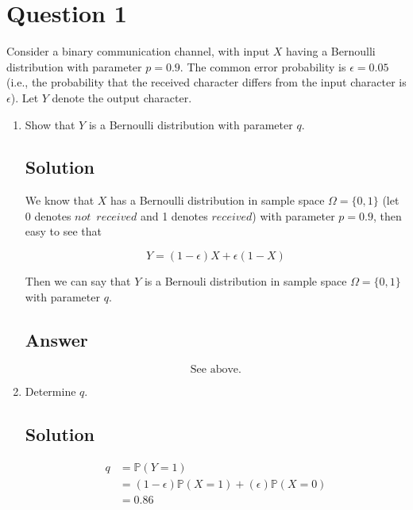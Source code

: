 \documentclass[12pt]{article}
\newcommand{\bP}{\mathbb{P}}
\begin{document}
	
	\section*{Question 1}
	
	\noindent Consider a binary communication channel, with input $X$ having a Bernoulli distribution with parameter $p = 0.9$. The common error probability is $\epsilon = 0.05$ (i.e., the probability that the received character differs from the input character is $\epsilon$). Let $Y$ denote the output character.
	
	\bigskip
	
	\begin{enumerate}[start=1,label={\bfseries Part \arabic*:},leftmargin=0in]
		\bigskip\item Show that $Y$ is a Bernoulli distribution with parameter $q$.
		
		\subsection*{Solution}
		
			We know that $X$ has a Bernoulli distribution in sample space $\Omega = \{0,1\}$ (let 0 denotes $not\enspace received$ and 1 denotes $received$) with parameter $p = 0.9$, then easy to see that
			
			\[Y = (1-\epsilon)X + \epsilon(1-X)\]
			
			Then we can say that $Y$ is a Bernouli distribution in sample space $\Omega = \{0,1\}$ with parameter $q$.
		
		\subsection*{Answer}
		
			\[\boxed{\text{See above.}}\]
		
		\bigskip\item Determine $q$.
		
		\subsection*{Solution}
		
			\[
			\begin{aligned}
				q &= \bP(Y = 1)\\
				&= (1-\epsilon)\bP(X = 1) + (\epsilon)\bP(X = 0)\\
				&= 0.86
			\end{aligned}
			\]
		

\end{enumerate}
\end{document}
